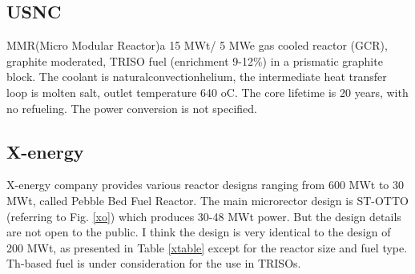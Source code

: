 \subsection{USNC}
MMR(Micro Modular Reactor)a 15 MWt/ 5 MWe gas cooled reactor (GCR),  graphite  moderated,  TRISO  fuel  (enrichment 9-12\%)  in  a  prismatic  graphite  block. The  coolant  is naturalconvectionhelium, the intermediate heat transfer loop is molten salt, outlet temperature 640 oC. The core lifetime is 20 years, with no refueling. The power conversion is not specified.

\pagebreak
\subsection{X-energy}
X-energy company provides various reactor designs ranging from 600 MWt to 30 MWt, called Pebble Bed Fuel Reactor. The main microrector design is ST-OTTO (referring to Fig.  \ref{xo}) which produces 30-48 MWt power. But the design details are not open to the public. I think the design is very identical to the design of 200 MWt, as presented in Table \ref{xtable} except for the reactor size and fuel type. Th-based fuel is under consideration for the use in TRISOs. 

